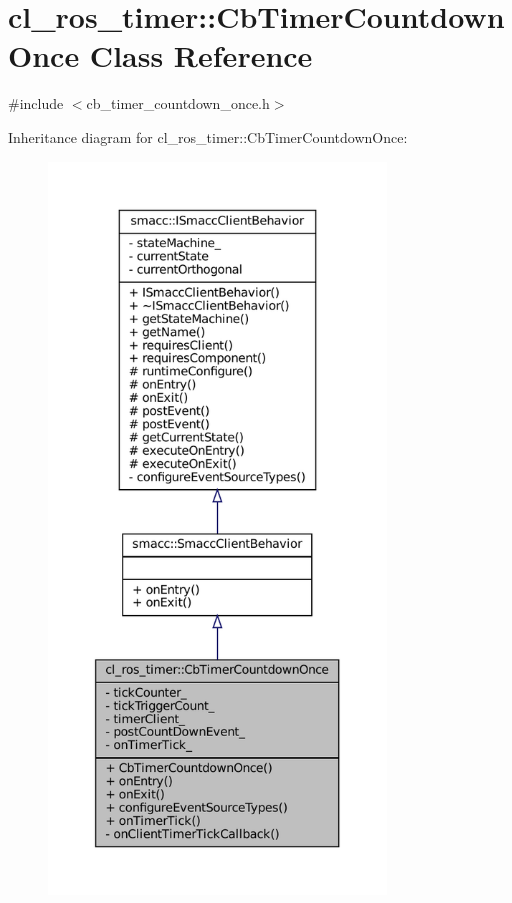 \hypertarget{classcl__ros__timer_1_1CbTimerCountdownOnce}{}\section{cl\+\_\+ros\+\_\+timer\+:\+:Cb\+Timer\+Countdown\+Once Class Reference}
\label{classcl__ros__timer_1_1CbTimerCountdownOnce}


{\ttfamily \#include $<$cb\+\_\+timer\+\_\+countdown\+\_\+once.\+h$>$}



Inheritance diagram for cl\+\_\+ros\+\_\+timer\+:\+:Cb\+Timer\+Countdown\+Once\+:
\nopagebreak
\begin{figure}[H]
\begin{center}
\leavevmode
\includegraphics[height=550pt]{classcl__ros__timer_1_1CbTimerCountdownOnce__inherit__graph}
\end{center}
\end{figure}


